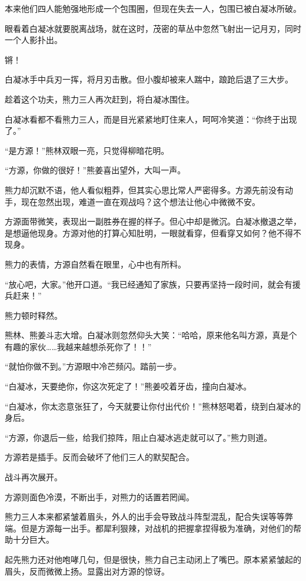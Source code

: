 \begin{this_body}
本来他们四人能勉强地形成一个包围圈，但现在失去一人，包围已被白凝冰所破。

眼看着白凝冰就要脱离战场，就在这时，茂密的草丛中忽然飞射出一记月刃，同时一个人影扑出。

锵！

白凝冰手中兵刃一挥，将月刃击散。但小腹却被来人踹中，踉跄后退了三大步。

趁着这个功夫，熊力三人再次赶到，将白凝冰围住。

白凝冰看都不看熊力三人，而是目光紧紧地盯住来人，呵呵冷笑道：“你终于出现了。”

“是方源！”熊林双眼一亮，只觉得柳暗花明。

“方源，你做的很好！”熊姜喜出望外，大叫一声。

熊力却沉默不语，他人看似粗莽，但其实心思比常人严密得多。方源先前没有动手，现在忽然出现，难道一直在观战吗？这个想法让他心中微微不安。

方源面带微笑，表现出一副胜券在握的样子。但心中却是微沉。白凝冰撤退之举，是想逼他现身。方源对他的打算心知肚明，一眼就看穿，但看穿又如何？他不得不现身。

熊力的表情，方源自然看在眼里，心中也有所料。

“放心吧，大家。”他开口道。“我已经通知了家族，只要再坚持一段时间，就会有援兵赶来！”

熊力顿时释然。

熊林、熊姜斗志大增。白凝冰则忽然仰头大笑：“哈哈，原来他名叫方源，真是个有趣的家伙……我越来越想杀死你了！！”

“就怕你做不到。”方源眼中冷芒频闪。踏前一步。

“白凝冰，天要绝你，你这次死定了！”熊姜咬着牙齿，撞向白凝冰。

“白凝冰，你太恣意张狂了，今天就要让你付出代价！”熊林怒喝着，绕到白凝冰的身后。

“方源，你退后一些，给我们掠阵，阻止白凝冰逃走就可以了。”熊力则道。

方源若是插手。反而会破坏了他们三人的默契配合。

战斗再次展开。

方源则面色冷漠，不断出手，对熊力的话置若罔闻。

熊力三人本来都紧皱着眉头，外人的出手会导致战斗阵型混乱，配合失误等等弊端。但是方源每一出手。都犀利狠辣，对战机的把握拿捏得极为准确，对他们的帮助十分巨大。

起先熊力还对他咆哮几句，但是很快，熊力自己主动闭上了嘴巴。原本紧紧皱起的眉头，反而微微上扬。显露出对方源的惊讶。


\end{this_body}

